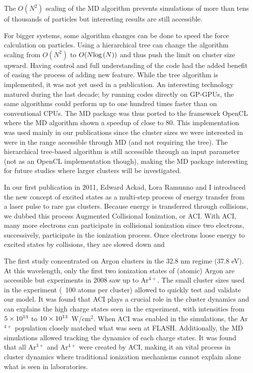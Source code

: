 The $O(N^2)$ scaling of the MD algorithm prevents simulations of more than tens
of thousands of particles but interesting results are still accessible.

For bigger systems, some algorithm changes can be done to speed the force
calculation on particles. Using a hierarchical tree can change the algorithm
scaling from $O(N^2)$ to $O(N \textrm{log}\left( N \right))$ and thus push the limit on
cluster size upward. Having control and full understanding of the code had
the added benefit of easing the process of adding new feature. While the tree
algorithm is implemented, it was not yet used in a publication. An interesting
technology matured during the last decade; by running codes directly on GP-GPUs,
the same algorithms could perform up to one hundred times faster than on
conventional CPUs. The MD package was thus ported to the framework OpenCL where
the MD algorithm shown a speedup of close to 80. This implementation was used
mainly in our publications since the cluster sizes we were interested in were
in the range accessible through MD (and not requiring the tree). The
hierarchical tree-based algorithm is still accessible through an input parameter
(not as an OpenCL implementation though), making the MD package interesting for
future studies where larger clusters will be investigated.

In our first publication in 2011, Edward Ackad, Lora Ramunno and I introduced
the new concept of excited states as a multi-step process of energy transfer
from a laser pulse to rare gas clusters. Because energy is transferred through
collisions, we dubbed this process Augmented Collisional Ionization, or ACI.
With ACI, many more electrons can participate in collisional ionization since
two electrons, successively, participate in the ionization process. Once
electrons loose energy to excited states by collisions, they are slowed down
and

The first study concentrated on Argon clusters in the 32.8 nm regime (37.8 eV).
At this wavelength, only the first two ionization states of (atomic) Argon are
accessible but experiments in 2008 saw up to Ar$^{4+}$. The small cluster sizes
used in the experiment (~100 atoms per cluster) allowed to quickly test and
validate our model. It was found that ACI plays a crucial role in the cluster
dynamics and can explains the high charge states seen in the experiment, with
intensities from $\ten{5}{13}$ to $\ten{10}{13}$~W/cm$^{2}$. When ACI was
enabled in the simulations, the Ar$^{4+}$ population closely matched what was
seen at FLASH. Additionally, the MD simulations allowed tracking the dynamics
of each charge states. It was found that all Ar$^{3+}$ and Ar$^{4+}$ were
created by ACI, making it an vital process in cluster dynamics where traditional
ionization mechanisms cannot explain alone what is seen in laboratories.

